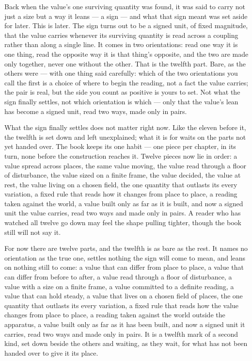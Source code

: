 Back when the value's one surviving quantity was found, it was said to carry not just a size but a way it leans --- a sign --- and what that sign meant was set aside for later. This is later. The sign turns out to be a signed unit, of fixed magnitude, that the value carries whenever its surviving quantity is read across a coupling rather than along a single line. It comes in two orientations: read one way it is one thing, read the opposite way it is that thing's opposite, and the two are made only together, never one without the other. That is the twelfth part. Bare, as the others were --- with one thing said carefully: which of the two orientations you call the first is a choice of where to begin the reading, not a fact the value carries; the pair is real, but the side you count as positive is yours to set. Not what the sign finally settles, not which orientation is which --- only that the value's lean has become a signed unit, read two ways, made only in pairs.

What the sign finally settles does not matter right now. Like the eleven before it, the twelfth is set down and left unexplained; what it is for waits on the parts not yet handed over. The book keeps its one habit --- one piece per chapter, in its turn, none before the construction reaches it. Twelve pieces now lie in order: a value spread across places, the same value moving, the value read through a floor of disturbance, the value sized on a finite frame, the value decided, the value at rest, the value living on a chosen field, the one quantity that outlasts its every variation, a fixed rule that reads how it changes from place to place, a reading taken against the world, a value built only as far as it is built, and now a signed unit the value carries, read two ways and made only in pairs. A reader who has watched all twelve go down may feel the shape pulling tighter, though the book still will not say it.

For now there are twelve parts, and the twelfth is as bare as the rest. It names no orientation as the true one, settles nothing the sign will come to mean, and leans on nothing still to come: a value that can differ from place to place, a value that can differ from before to after, a value read through a floor of disturbance, a value with a size on a finite frame, a value committed to a definite reading, a value that can hold steady, a value that lives on a chosen field of places, the one quantity that outlasts its every variation, a fixed rule that reads how the value changes from place to place, a reading taken against the world outside the apparatus, a value built only as far as it has been built, and now a signed unit it carries, read two ways and made only in pairs. It is a twelfth mark of a second kind, set down beside the others and waiting, as they wait, for what has not been handed over to give it its place.
